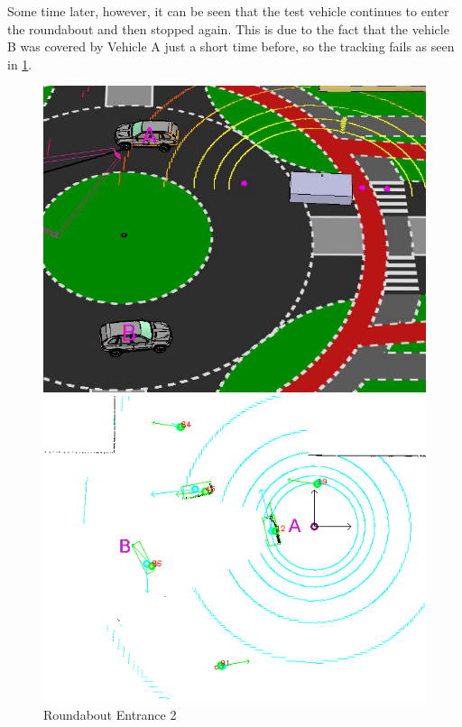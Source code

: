 \documentclass[11pt,oneside,openright]{mpreport}
\begin{document}

Some time later, however, it can be seen that the test vehicle continues to enter the roundabout and then stopped again.
This is due to the fact that the vehicle B was covered by Vehicle A just a short time before, so the tracking fails as seen in \cref{roundabout_entrance_2}.

\begin{figure}[htb]
  \caption{Roundabout Entrance 2} 
    \centering
    \begin{minipage}[t]{0.49\textwidth}
        \centering
          \includegraphics[width=\textwidth]{bilder/sim03.png}
    \end{minipage}%
    \hfill
    \begin{minipage}[t]{0.49\textwidth}
        \centering
	\includegraphics[width=\textwidth]{bilder/sim04.png}
    \end{minipage}
    \label{roundabout_entrance_2}
\end{figure}
\end{document}
